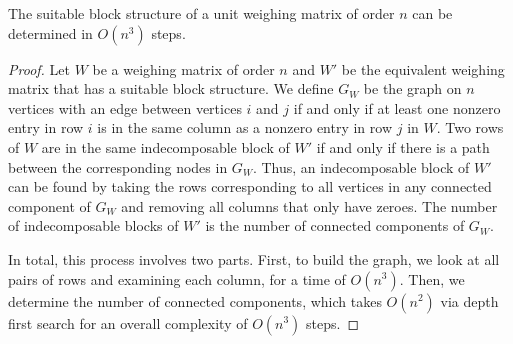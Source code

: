 \begin{lemma}\label{lem:block-complexity}
 The suitable block structure of a unit weighing matrix of order $n$ can be determined in $O(n^3)$ steps.

 \begin{proof}
  Let $W$ be a weighing matrix of order $n$ and $W'$ be the equivalent weighing matrix that has a suitable block structure. We define $G_{W}$ be the graph on $n$ vertices with an edge between vertices $i$ and $j$ if and only if at least one nonzero entry in row $i$ is in the same column as a nonzero entry in row $j$ in $W$. Two rows of $W$ are in the same indecomposable block of $W'$ if and only if there is a path between the corresponding nodes in $G_W$. Thus, an indecomposable block of $W'$ can be found by taking the rows corresponding to all vertices in any connected component of $G_W$ and removing all columns that only have zeroes. The number of indecomposable blocks of $W'$ is the number of connected components of $G_W$.


  In total, this process involves two parts. First, to build the graph, we look at all pairs of rows and examining each column, for a time of $O(n^3)$. Then, we determine the number of connected components, which takes $O(n^2)$ via depth first search for an overall complexity of $O(n^3)$ steps.
 \end{proof}
\end{lemma}

